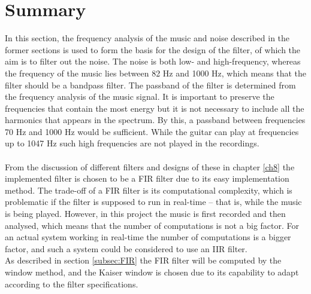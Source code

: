 \section{Summary} \label{sec:filtervalg}
In this section, the frequency analysis of the music and noise described in the former sections is used to form the basis for the design of the filter, of which the aim is to filter out the noise. The noise is both low- and high-frequency, whereas the frequency of the music lies between 82 Hz and 1000 Hz, which means that the filter should be a bandpass filter. The passband of the filter is determined from the frequency analysis of the music signal. It is important to preserve the frequencies that contain the most energy but it is not necessary to include all the harmonics that appears in the spectrum. By this, a passband between frequencies 70 Hz and 1000 Hz would be sufficient. While the guitar can play at frequencies up to 1047 Hz such high frequencies are not played in the recordings.\\\\
From the discussion of different filters and designs of these in chapter \ref{ch8} the implemented filter is chosen to be a FIR filter due to its easy implementation method. The trade-off of a FIR filter is its computational complexity, which is problematic if the filter is supposed to run in real-time -- that is, while the music is being played. However, in this project the music is first recorded and then analysed, which means that the number of computations is not a big factor. For an actual system working in real-time the number of computations is a bigger factor, and such a system could be considered to use an IIR filter.\\
As described in section \ref{subsec:FIR} the FIR filter will be computed by the window method, and the Kaiser window is chosen due to its capability to adapt according to the filter specifications.     